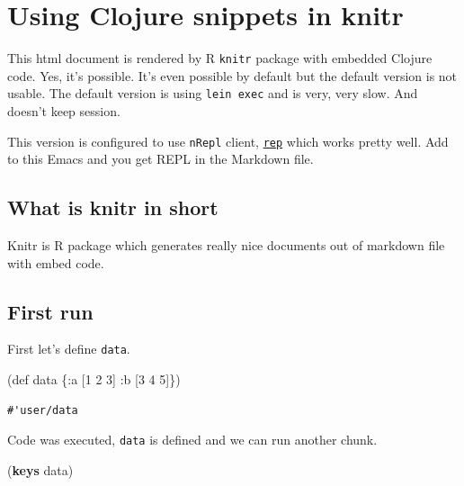 \documentclass[]{article}
\author{}
\date{\vspace{-2.5em}}
\newenvironment{Shaded}{\begin{snugshade}}{\end{snugshade}}
\newcommand{\KeywordTok}[1]{\textcolor[rgb]{0.13,0.29,0.53}{\textbf{#1}}}
\newcommand{\DecValTok}[1]{\textcolor[rgb]{0.00,0.00,0.81}{#1}}
\newcommand{\FunctionTok}[1]{\textcolor[rgb]{0.00,0.00,0.00}{#1}}
\newcommand{\BuiltInTok}[1]{#1}
\newcommand{\AttributeTok}[1]{\textcolor[rgb]{0.77,0.63,0.00}{#1}}
\newcommand{\NormalTok}[1]{#1}
\begin{document}
\section{Using Clojure snippets in
knitr}\label{using-clojure-snippets-in-knitr}

This html document is rendered by R \texttt{knitr} package with embedded
Clojure code. Yes, it's possible. It's even possible by default but the
default version is not usable. The default version is using
\texttt{lein\ exec} and is very, very slow. And doesn't keep session.

This version is configured to use \texttt{nRepl} client,
\href{https://github.com/eraserhd/rep}{\texttt{rep}} which works pretty
well. Add to this Emacs and you get REPL in the Markdown file.

\subsection{What is knitr in short}\label{what-is-knitr-in-short}

Knitr is R package which generates really nice documents out of markdown
file with embed code.

\subsection{First run}\label{first-run}

First let's define \texttt{data}.

\begin{Shaded}
\begin{Highlighting}[]
\NormalTok{(}\BuiltInTok{def}\FunctionTok{ data }\NormalTok{\{}\AttributeTok{:a}\NormalTok{ [}\DecValTok{1} \DecValTok{2} \DecValTok{3}\NormalTok{]}
           \AttributeTok{:b}\NormalTok{ [}\DecValTok{3} \DecValTok{4} \DecValTok{5}\NormalTok{]\})}
\end{Highlighting}
\end{Shaded}

\begin{verbatim}
#'user/data
\end{verbatim}

Code was executed, \texttt{data} is defined and we can run another
chunk.

\begin{Shaded}
\begin{Highlighting}[]
\NormalTok{(}\KeywordTok{keys}\NormalTok{ data)}
\end{Highlighting}
\end{Shaded}
\end{document}
